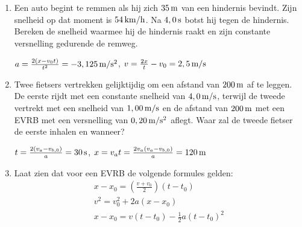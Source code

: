 \begin{enumerate}
\item Een auto begint te remmen als hij zich $35\rm\,m$ van een hindernis bevindt. Zijn snelheid op dat moment is $54\rm\,km/h$. Na $4,0\rm\,s$ botst hij tegen de hindernis. Bereken de snelheid waarmee hij de hindernis raakt en zijn constante versnelling gedurende de remweg.
\begin{oplossing}
$a=\frac{2(x-v_0t)}{t^2}=-3,125\rm\,m/s^2$, $v=\frac{2x}{t}-v_0=2,5\rm\,m/s$
\end{oplossing}

\item Twee fietsers vertrekken gelijktijdig om
een afstand van $200\rm\,m$ af te leggen. De eerste rijdt met een
constante snelheid van $4,0\rm\,m/s$, terwijl de tweede vertrekt met
een snelheid van $1,00\rm\,m/s$ en de afstand van $200\rm\,m$ met
een EVRB met een versnelling van $0,20\rm\,m/s^2$ aflegt. Waar zal
de tweede fietser de eerste inhalen en wanneer?
\begin{oplossing}
\newline
$t=\frac{2(v_a-v_{b,0})}{a}=30\rm\,s$,
$x=v_at=\frac{2v_a(v_a-v_{b,0})}{a}=120\rm\,m$
\end{oplossing}

\item Laat zien dat voor een EVRB de volgende formules gelden:
\begin{eqnarray*}
x-x_0=\left(\frac{v+v_0}{2}\right)(t-t_0)\\
v^2=v_0^2+2a(x-x_0)\\
x-x_0=v(t-t_0)-\frac{1}{2}a(t-t_0)^2
\end{eqnarray*}


\end{enumerate}
